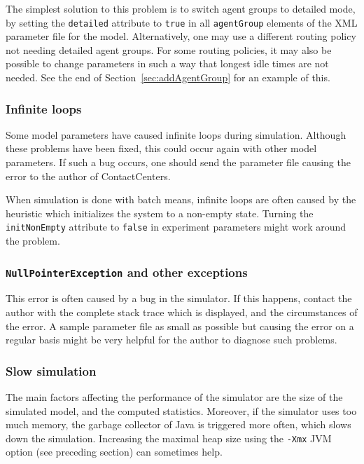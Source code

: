 The simplest solution to this problem is to switch agent groups to
detailed mode, by setting the \texttt{detailed} attribute to
\texttt{true} in all \texttt{agent\-Group} elements of the
XML parameter file for the model.
Alternatively, one may use a different routing policy not needing
detailed agent groups.
For some routing policies, it may also be possible to change
parameters in such a way that longest idle times are not needed.
See the end of Section~\ref{sec:addAgentGroup} for an example of this.

\subsubsection{Infinite loops}

Some model parameters have caused infinite loops
during simulation.
Although these problems have been fixed, this could occur again with
other model parameters.
If  such a bug occurs, one should send the parameter file causing the
error to the author of ContactCenters.

When simulation is done with batch means, infinite loops are often
caused by the heuristic which initializes the system to a non-empty
state.
Turning the \texttt{init\-Non\-Empty} attribute to \texttt{false} in
experiment parameters might work around the problem.

\subsubsection{\texttt{Null\-Pointer\-Exception} and other exceptions}

This error is often caused by a bug in the simulator.
If this happens, contact the author with the complete stack trace
which is displayed, and the circumstances of the error.
A sample parameter file as small as possible
but causing the error
on a regular basis might be very helpful for
the author to diagnose such problems.

\subsubsection{Slow simulation}

The main factors affecting the performance of the simulator are
the size of the simulated model, and the computed statistics.
Moreover, if the simulator uses too much memory, the garbage collector
of Java is triggered more often, which slows down the simulation.
Increasing the maximal heap size using the \texttt{-Xmx} JVM option
(see preceding section) can sometimes help.

